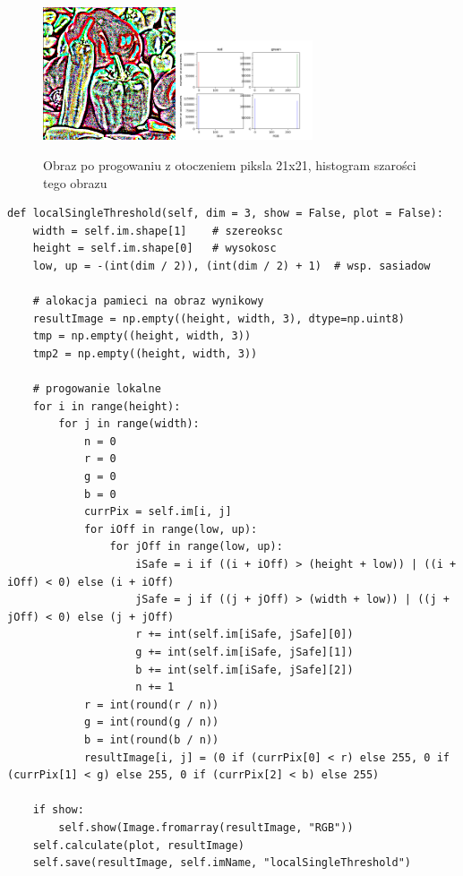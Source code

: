 \documentclass[final,a4paper,openany,12pt]{mwbk}
\begin{document}
\begin{figure}[H]
	\begin{center}
		\includegraphics[width=0.35\textwidth]{peppers_color_localSingleThreshold_result}
		\includegraphics[width=0.35\textwidth]{peppers_color_localSingleThreshold_histogram}
	\end{center}
	\caption{Obraz po progowaniu z otoczeniem piksla 21x21, histogram szarości tego obrazu}
\end{figure}


\begin{lstlisting}[caption=Progowanie 1-progowe lokalne]
def localSingleThreshold(self, dim = 3, show = False, plot = False):
	width = self.im.shape[1]    # szereoksc
	height = self.im.shape[0]   # wysokosc
	low, up = -(int(dim / 2)), (int(dim / 2) + 1)  # wsp. sasiadow
	
	# alokacja pamieci na obraz wynikowy
	resultImage = np.empty((height, width, 3), dtype=np.uint8)
	tmp = np.empty((height, width, 3))
	tmp2 = np.empty((height, width, 3))
	
	# progowanie lokalne
	for i in range(height):
		for j in range(width):
			n = 0
			r = 0
			g = 0
			b = 0
			currPix = self.im[i, j]
			for iOff in range(low, up):
				for jOff in range(low, up):
					iSafe = i if ((i + iOff) > (height + low)) | ((i + iOff) < 0) else (i + iOff)
					jSafe = j if ((j + jOff) > (width + low)) | ((j + jOff) < 0) else (j + jOff)
					r += int(self.im[iSafe, jSafe][0])
					g += int(self.im[iSafe, jSafe][1])
					b += int(self.im[iSafe, jSafe][2])
					n += 1
			r = int(round(r / n))
			g = int(round(g / n))
			b = int(round(b / n))
			resultImage[i, j] = (0 if (currPix[0] < r) else 255, 0 if (currPix[1] < g) else 255, 0 if (currPix[2] < b) else 255)
	
	if show:
		self.show(Image.fromarray(resultImage, "RGB"))
	self.calculate(plot, resultImage)
	self.save(resultImage, self.imName, "localSingleThreshold")
\end{lstlisting}
\end{document}
